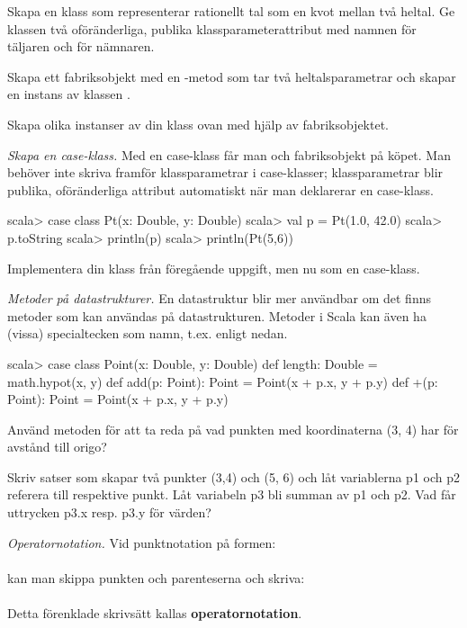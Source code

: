 \Subtask Skapa en klass  som representerar rationellt tal som en kvot mellan två heltal. Ge klassen två oföränderliga, publika klassparameterattribut med namnen  för täljaren och  för nämnaren. 

\Subtask Skapa ett fabriksobjekt med en -metod som tar två heltalsparametrar och skapar en instans av klassen .

\Subtask Skapa olika instanser av din klass  ovan med hjälp av fabriksobjektet.


\Task \emph{Skapa en case-klass.} Med en case-klass får man  och fabriksobjekt på köpet. Man behöver inte skriva  framför klassparametrar i case-klasser; klassparametrar blir publika, oföränderliga attribut automatiskt när man deklarerar en case-klass.

\begin{REPL}
scala> case class Pt(x: Double, y: Double) 
scala> val p = Pt(1.0, 42.0)
scala> p.toString
scala> println(p)
scala> println(Pt(5,6))
\end{REPL}

\Subtask Implementera din klass  från föregående uppgift, men nu som en case-klass.
	
\Task \label{task:point} \emph{Metoder på datastrukturer.} En datastruktur blir mer användbar om det finns metoder som kan användas på datastrukturen. Metoder i Scala kan även ha (vissa) specialtecken som namn, t.ex. \code{+} enligt nedan.  
\begin{REPL}
scala> case class Point(x: Double, y: Double) {
         def length: Double = math.hypot(x, y)   
         def add(p: Point): Point = Point(x + p.x, y + p.y)
         def +(p: Point): Point = Point(x + p.x, y + p.y)
       }
\end{REPL}

\Subtask Använd metoden  för att ta reda på vad punkten med koordinaterna (3, 4) har för avstånd till origo?

\Subtask Skriv satser som skapar två punkter (3,4) och (5, 6) och låt variablerna p1 och p2 referera till respektive punkt. Låt variabeln p3 bli summan av p1 och p2. Vad får uttrycken p3.x resp. p3.y för värden?

\Task \emph{Operatornotation.} Vid punktnotation på formen: \\  \\ kan man skippa punkten och parenteserna och skriva:\\   \\
Detta förenklade skrivsätt kallas \textbf{operatornotation}.

